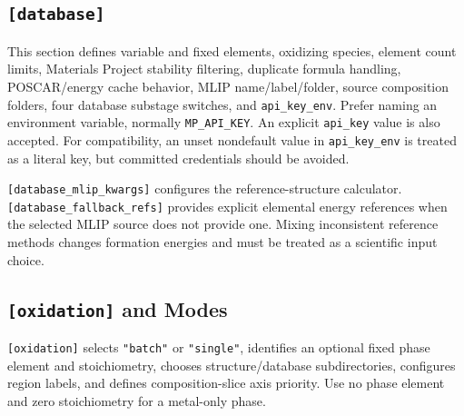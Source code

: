 \documentclass[11pt,letterpaper]{article}
\newcommand{\file}[1]{\nolinkurl{#1}}
\newcommand{\setting}[1]{\nolinkurl{#1}}
\begin{document}
\subsection{\texttt{[database]}}

This section defines variable and fixed elements, oxidizing species, element
count limits, Materials Project stability filtering, duplicate formula
handling, POSCAR/energy cache behavior, MLIP name/label/folder, source
composition folders, four database substage switches, and
\setting{api_key_env}. Prefer naming an environment variable, normally
\file{MP_API_KEY}. An explicit \setting{api_key} value is also accepted.
For compatibility, an unset nondefault value in \setting{api_key_env} is
treated as a literal key, but committed credentials should be avoided.

\setting{[database_mlip_kwargs]} configures the reference-structure
calculator. \setting{[database_fallback_refs]} provides explicit elemental
energy references when the selected MLIP source does not provide one. Mixing
inconsistent reference methods changes formation energies and must be treated
as a scientific input choice.

\subsection{\texttt{[oxidation]} and Modes}

\setting{[oxidation]} selects \file{"batch"} or \file{"single"}, identifies an
optional fixed phase element and stoichiometry, chooses structure/database
subdirectories, configures region labels, and defines composition-slice axis
priority. Use no phase element and zero stoichiometry for a metal-only phase.
\end{document}
